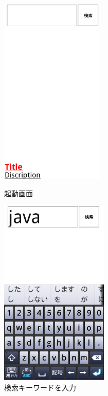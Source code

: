 \begin{figure}[htbp]
 \begin{minipage}{0.45\hsize}
  \begin{center}
   \includegraphics[height=90mm]{eps/le01.eps}
  \end{center}
  \caption{起動画面}
  \label{le01}
 \end{minipage}
 \begin{minipage}{0.45\hsize}
  \begin{center}
   \includegraphics[height=90mm]{eps/le02.eps}
  \end{center}
  \caption{検索キーワードを入力}
  \label{le02}
 \end{minipage}
\end{figure}

